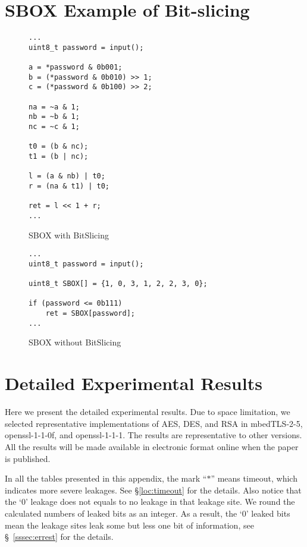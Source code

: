 \clearpage
\section{SBOX Example of Bit-slicing}
\label{appendix:SBOX}

\begin{figure}[h!]
      \centering
      \begin{lstlisting}[xleftmargin=.02\textwidth,xrightmargin=.01\textwidth]
...
uint8_t password = input();

a = *password & 0b001;
b = (*password & 0b010) >> 1;
c = (*password & 0b100) >> 2;

na = ~a & 1;
nb = ~b & 1;
nc = ~c & 1;

t0 = (b & nc);
t1 = (b | nc);

l = (a & nb) | t0;
r = (na & t1) | t0;

ret = l << 1 + r;
...
      \end{lstlisting}
      \caption{SBOX with BitSlicing}
      \label{fig:SBOX_bitslicing}
\end{figure}

\begin{figure}[h!]
      \centering
      \begin{lstlisting}[xleftmargin=.02\textwidth,xrightmargin=.01\textwidth]
...
uint8_t password = input();

uint8_t SBOX[] = {1, 0, 3, 1, 2, 2, 3, 0};

if (password <= 0b111)
    ret = SBOX[password];
...
      \end{lstlisting}
      \caption{SBOX without BitSlicing}
      \label{fig:SBOX_da}
\end{figure}

\section{Detailed Experimental Results}
\label{sec:result-table}

Here we present the detailed experimental results.
Due to space limitation, we selected representative implementations of
AES, DES, and RSA in
mbedTLS-2-5, 
openssl-1-1-0f,  and
openssl-1-1-1.  
The results are representative to other versions.
All the results will be made available in electronic format online
when the paper is published. %

In all the tables presented in this appendix, the mark ``$*$'' means timeout,
which indicates more severe leakages. See \S\ref{loc:timeout} for the details.
Also notice that the `0' leakage does not equals to no leakage in that leakage
site. We round the calculated numbers of leaked bits as an integer. As a result,
the `0' leaked bits mean the leakage sites leak some but less one bit of
information, see \S~\ref{sssec:errest} for the details.

